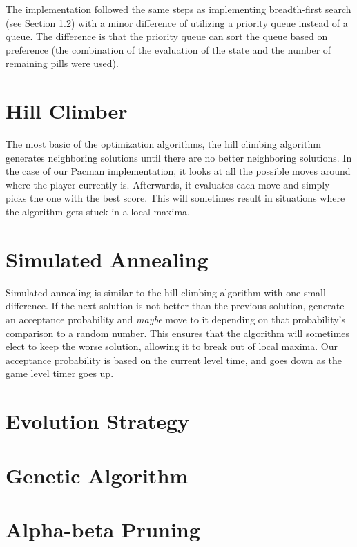 \documentclass[a4paper,oneside,10pt]{report}
\begin{document}
The implementation followed the same steps as implementing breadth-first search (see Section 1.2) with a minor difference of utilizing a priority queue instead of a queue. The difference is that the priority queue can sort the queue based on preference (the combination of the evaluation of the state and the number of remaining pills were used). 

\section{Hill Climber}\label{hill}

The most basic of the optimization algorithms, the hill climbing algorithm generates neighboring solutions until there are no better neighboring solutions. In the case of our Pacman implementation, it looks at all the possible moves around where the player currently is. Afterwards, it evaluates each move and simply picks the one with the best score. This will sometimes result in situations where the algorithm gets stuck in a local maxima.

\section{Simulated Annealing}\label{sannealing}

Simulated annealing is similar to the hill climbing algorithm with one small difference. If the next solution is not better than the previous solution, generate an acceptance probability and \textit{maybe} move to it depending on that probability's comparison to a random number. This ensures that the algorithm will sometimes elect to keep the worse solution, allowing it to break out of local maxima. Our acceptance probability is based on the current level time, and goes down as the game level timer goes up. 

\section{Evolution Strategy}\label{evolution}

\section{Genetic Algorithm}\label{genetic}

\section{Alpha-beta Pruning}\label{alphabeta}
\end{document}
